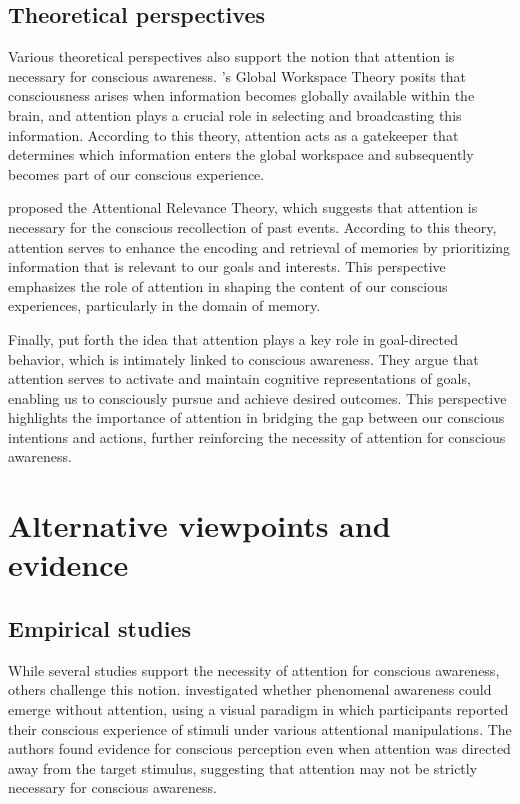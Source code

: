 \documentclass[10pt]{article}
\begin{document}
\begin{sloppypar}
  \subsection{Theoretical perspectives}
  \label{sec:theoretical}

  Various theoretical perspectives also support the notion that attention is necessary for conscious awareness. \cite{baars_essential_1997}'s Global Workspace Theory posits that consciousness arises when information becomes globally available within the brain, and attention plays a crucial role in selecting and broadcasting this information. According to this theory, attention acts as a gatekeeper that determines which information enters the global workspace and subsequently becomes part of our conscious experience.

  \cite{de_brigard_role_2012} proposed the Attentional Relevance Theory, which suggests that attention is necessary for the conscious recollection of past events. According to this theory, attention serves to enhance the encoding and retrieval of memories by prioritizing information that is relevant to our goals and interests. This perspective emphasizes the role of attention in shaping the content of our conscious experiences, particularly in the domain of memory.

  Finally, \cite{dijksterhuis_goals_2010} put forth the idea that attention plays a key role in goal-directed behavior, which is intimately linked to conscious awareness. They argue that attention serves to activate and maintain cognitive representations of goals, enabling us to consciously pursue and achieve desired outcomes. This perspective highlights the importance of attention in bridging the gap between our conscious intentions and actions, further reinforcing the necessity of attention for conscious awareness.

  \section{Alternative viewpoints and evidence}
  \label{sec:alternative}

  \subsection{Empirical studies}
  \label{sec:empirical_alt}
  While several studies support the necessity of attention for conscious awareness, others challenge this notion. \cite{aru_phenomenal_2013} investigated whether phenomenal awareness could emerge without attention, using a visual paradigm in which participants reported their conscious experience of stimuli under various attentional manipulations. The authors found evidence for conscious perception even when attention was directed away from the target stimulus, suggesting that attention may not be strictly necessary for conscious awareness.


\end{sloppypar}
\end{document}
